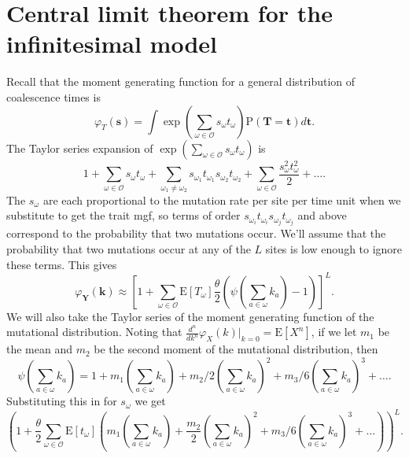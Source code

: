 \documentclass{article}
\newcommand{\T}{\frac{\theta}{2}}
\newcommand{\E}{\mathrm{E}}
\newcommand{\Pro}{\mathrm{P}}
\begin{document}
\section{Central limit theorem for the infinitesimal model}
\label{clt}
Recall that the moment generating function for a general distribution of
coalescence times is
\begin{equation*}
  \varphi_T(\mathbf{s}) = \int \exp \left( \sum_{\omega \in \mathcal{O}} s_{\omega}t_{\omega} \right)
  \Pro(\mathbf{T}=\mathbf{t})d\mathbf{t}.
\end{equation*}
The Taylor series expansion of
$\exp \left( \sum_{\omega \in \mathcal{O}} s_{\omega}t_{\omega} \right)$ is
\begin{equation}
  1 + \sum_{\omega \in \mathcal{O}} s_{\omega}t_{\omega} +
  \sum_{\omega_1 \neq \omega_2} s_{\omega_1}t_{\omega_1}s_{\omega_2}t_{\omega_2} + 
  \sum_{\omega \in \mathcal{O}} \frac{s_{\omega}^2t_{\omega}^2}{2} + \ldots. \nonumber
\end{equation}
The $s_\omega$ are each proportional to the mutation rate per site per time unit
when we substitute to get the trait mgf, so terms of order
$s_{\omega_i}t_{\omega_i}s_{\omega_j}t_{\omega_j}$ and above correspond to the
probability that two mutations occur. We'll assume that the probability that two
mutations occur at any of the $L$ sites is low enough to ignore these terms.
This gives 
\begin{equation*}
  \varphi_{\mathbf{Y}}(\mathbf{k}) \approx \left[ 1 + \sum_{\omega \in \mathcal{O}}
    \E[T_\omega] \T \left( \psi\left( \sum_{a \in \omega} k_a\right) -1 \right) \right]^L.
\end{equation*}
We will also take the
Taylor series of the moment generating function of the mutational distribution.
Noting that $\frac{d^n}{dk^n}\varphi_X(k)\Bigr|_{k=0} = \E[X^n]$, if we let $m_1$
be the mean and $m_2$ be the second moment of the mutational distribution, then
\begin{equation*}
  \psi\left( \sum_{a \in \omega} k_a \right) = 1 + m_1 \left( \sum_{a \in \omega}
    k_a\right) + m_2/2\left( \sum_{a \in \omega} k_a\right)^2 + 
  m_3/6\left( \sum_{a \in \omega} k_a\right)^3 + \ldots.
\end{equation*}
Substituting this in for $s_\omega$ we get
\begin{equation*}
  \left( 1 + \frac{\theta}{2} \sum_{\omega \in \mathcal{O}} \E[t_{\omega}]\left( m_1 \left(
  \sum_{a \in \omega} k_a \right) + \frac{m_2}{2} \left( \sum_{a \in \omega}
  k_a\right)^2 + m_3/6\left( \sum_{a \in \omega} k_a\right)^3 + \ldots \right) \right)^L.
\end{equation*}
\end{document}
